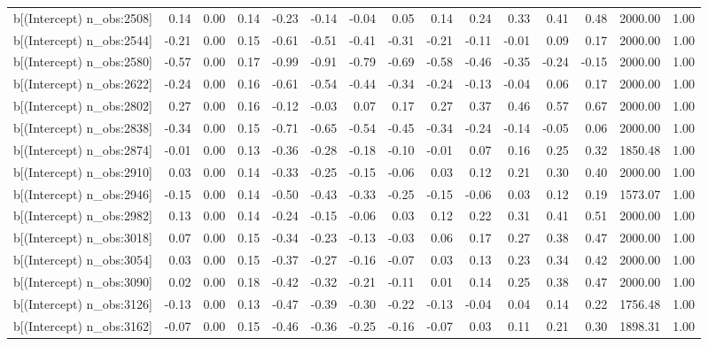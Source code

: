 \begin{table}[ht]
\begin{tabular}{rrrrrrrrrrrrrrr}
  b[(Intercept) n\_obs:2508] & 0.14 & 0.00 & 0.14 & -0.23 & -0.14 & -0.04 & 0.05 & 0.14 & 0.24 & 0.33 & 0.41 & 0.48 & 2000.00 & 1.00 \\ 
  b[(Intercept) n\_obs:2544] & -0.21 & 0.00 & 0.15 & -0.61 & -0.51 & -0.41 & -0.31 & -0.21 & -0.11 & -0.01 & 0.09 & 0.17 & 2000.00 & 1.00 \\ 
  b[(Intercept) n\_obs:2580] & -0.57 & 0.00 & 0.17 & -0.99 & -0.91 & -0.79 & -0.69 & -0.58 & -0.46 & -0.35 & -0.24 & -0.15 & 2000.00 & 1.00 \\ 
  b[(Intercept) n\_obs:2622] & -0.24 & 0.00 & 0.16 & -0.61 & -0.54 & -0.44 & -0.34 & -0.24 & -0.13 & -0.04 & 0.06 & 0.17 & 2000.00 & 1.00 \\ 
  b[(Intercept) n\_obs:2802] & 0.27 & 0.00 & 0.16 & -0.12 & -0.03 & 0.07 & 0.17 & 0.27 & 0.37 & 0.46 & 0.57 & 0.67 & 2000.00 & 1.00 \\ 
  b[(Intercept) n\_obs:2838] & -0.34 & 0.00 & 0.15 & -0.71 & -0.65 & -0.54 & -0.45 & -0.34 & -0.24 & -0.14 & -0.05 & 0.06 & 2000.00 & 1.00 \\ 
  b[(Intercept) n\_obs:2874] & -0.01 & 0.00 & 0.13 & -0.36 & -0.28 & -0.18 & -0.10 & -0.01 & 0.07 & 0.16 & 0.25 & 0.32 & 1850.48 & 1.00 \\ 
  b[(Intercept) n\_obs:2910] & 0.03 & 0.00 & 0.14 & -0.33 & -0.25 & -0.15 & -0.06 & 0.03 & 0.12 & 0.21 & 0.30 & 0.40 & 2000.00 & 1.00 \\ 
  b[(Intercept) n\_obs:2946] & -0.15 & 0.00 & 0.14 & -0.50 & -0.43 & -0.33 & -0.25 & -0.15 & -0.06 & 0.03 & 0.12 & 0.19 & 1573.07 & 1.00 \\ 
  b[(Intercept) n\_obs:2982] & 0.13 & 0.00 & 0.14 & -0.24 & -0.15 & -0.06 & 0.03 & 0.12 & 0.22 & 0.31 & 0.41 & 0.51 & 2000.00 & 1.00 \\ 
  b[(Intercept) n\_obs:3018] & 0.07 & 0.00 & 0.15 & -0.34 & -0.23 & -0.13 & -0.03 & 0.06 & 0.17 & 0.27 & 0.38 & 0.47 & 2000.00 & 1.00 \\ 
  b[(Intercept) n\_obs:3054] & 0.03 & 0.00 & 0.15 & -0.37 & -0.27 & -0.16 & -0.07 & 0.03 & 0.13 & 0.23 & 0.34 & 0.42 & 2000.00 & 1.00 \\ 
  b[(Intercept) n\_obs:3090] & 0.02 & 0.00 & 0.18 & -0.42 & -0.32 & -0.21 & -0.11 & 0.01 & 0.14 & 0.25 & 0.38 & 0.47 & 2000.00 & 1.00 \\ 
  b[(Intercept) n\_obs:3126] & -0.13 & 0.00 & 0.13 & -0.47 & -0.39 & -0.30 & -0.22 & -0.13 & -0.04 & 0.04 & 0.14 & 0.22 & 1756.48 & 1.00 \\ 
  b[(Intercept) n\_obs:3162] & -0.07 & 0.00 & 0.15 & -0.46 & -0.36 & -0.25 & -0.16 & -0.07 & 0.03 & 0.11 & 0.21 & 0.30 & 1898.31 & 1.00 \\ 

\end{tabular}
\end{table}
